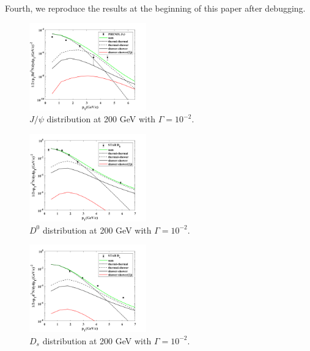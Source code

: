 \documentclass[twocolumn,aps,superscriptaddress,nofootinbib,floatfix]{revtex4}
\begin{document}
Fourth, we reproduce the results at the beginning of this paper after debugging.
\begin{figure}[H]
	\includegraphics[width=0.45\textwidth]{Jpsi200.png}
	\caption{$J/\psi$ distribution at 200 GeV with $\Gamma=10^{-2}$. }
	\label{fig69}
\end{figure}
\begin{figure}[H]
	\includegraphics[width=0.45\textwidth]{D0200.png}
	\caption{$D^0$ distribution at 200 GeV with $\Gamma=10^{-2}$. }
	\label{fig70}
\end{figure}
\begin{figure}[H]
	\includegraphics[width=0.45\textwidth]{Ds200.png}
	\caption{$D_s$ distribution at 200 GeV with $\Gamma=10^{-2}$. }
	\label{fig71}
\end{figure}
\end{document}
